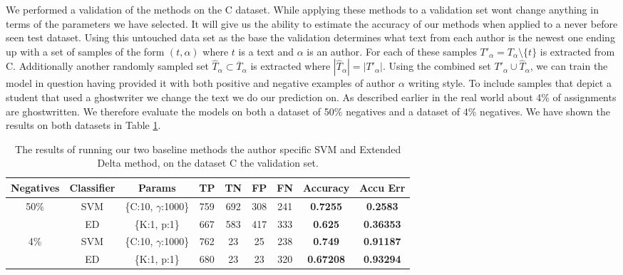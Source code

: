 We performed a validation of the methods on the \gls{C} dataset. While
applying these methods to a validation set wont change anything in terms of
the parameters we have selected. It will give us the ability to estimate the
accuracy of our methods when applied to a never before seen test dataset.
Using this untouched data set as the base the validation determines what text
from each author is the newest one ending up with a set of samples of the
form $(t, \alpha)$ where $t$ is a text and $\alpha$ is an author. For each
of these samples $T'_\alpha = T_\alpha \setminus \{t\}$ is extracted from
\gls{C}. Additionally another randomly sampled set $\hat{T}_\alpha \subset
\overline{T}_\alpha$ is extracted where $|\hat{T}_\alpha| = |T'_\alpha|$. Using
the combined set $T'_\alpha \cup \hat{T}_\alpha$, we can train the model in
question having provided it with both positive and negative examples of author
$\alpha$ writing style. To include samples that depict a student that used a
ghostwriter we change the text we do our prediction on. As described earlier in
the real world about 4\% of assignments are ghostwritten. We therefore evaluate
the models on both a dataset of 50\% negatives and a dataset of 4\% negatives.
We have shown the results on both datasets in Table \ref{tab:baseline-val-res}.

\begin{table}[h]
    \begin{adjustbox}{center}
    \begin{tabular}{|c|c|c|c|c|c|c||c|c|}
        \hline
        Negatives & Classifier & Params & TP & TN & FP & FN & \textbf{Accuracy} & \textbf{Accu Err} \\ \hline
        50\% & SVM & \{C:10, $\gamma$:1000\} &  759 & 692 & 308 & 241 & \textbf{0.7255} & \textbf{0.2583} \\ \cline{2-9} 
        & ED & \{K:1, p:1\} & 667 & 583 & 417 & 333 & \textbf{0.625} & \textbf{0.36353} \\ \hline
        4\% & SVM & \{C:10, $\gamma$:1000\} & 762 & 23 & 25 & 238 & \textbf{0.749} & \textbf{0.91187} \\ \cline{2-9} 
        & ED & \{K:1, p:1\} & 680 & 23 & 23 & 320 & \textbf{0.67208} & \textbf{0.93294} \\ \hline
    \end{tabular}
    \end{adjustbox}
    \caption{The results of running our two baseline methods the author specific
        \gls{SVM} and Extended Delta method, on the dataset \gls{C} the
        validation set.}
    \label{tab:baseline-val-res}
\end{table}

